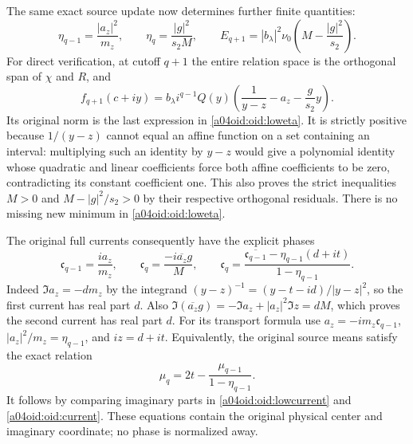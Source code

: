 The same exact source update now determines further finite quantities:
\begin{equation}\label{a04oid:oid:loweta}
 \boxed{\eta_{q-1}=\frac{|a_z|^2}{m_z},\qquad
 \eta_q=\frac{|g|^2}{s_2M},\qquad
 E_{q+1}=|b_\lambda|^2\nu_0
 \left(M-\frac{|g|^2}{s_2}\right).}
\end{equation}
For direct verification, at cutoff $q+1$ the entire relation space
is the orthogonal span of $\chi$ and $R$, and
\[
 f_{q+1}(c+iy)=b_\lambda i^{q-1}Q(y)
 \left(\frac1{y-z}-a_z-\frac{g}{s_2}y\right).
\]
Its original norm is the last expression in \eqref{a04oid:oid:loweta}.
It is strictly positive because $1/(y-z)$ cannot equal an affine
function on a set containing an interval: multiplying such an
identity by $y-z$ would give a polynomial identity whose quadratic
and linear coefficients force both affine coefficients to be zero,
contradicting its constant coefficient one. This also proves the
strict inequalities $M>0$ and $M-|g|^2/s_2>0$ by their respective
orthogonal residuals. There is no missing new minimum in
\eqref{a04oid:oid:loweta}.

The original full currents consequently have the explicit phases
\begin{equation}\label{a04oid:oid:lowcurrent}
 \mathfrak c_{q-1}=\frac{i a_z}{m_z},\qquad
 \mathfrak c_q=\frac{-i\overline{a_z}g}{M},\qquad
 \boxed{\mathfrak c_q=
 \frac{\overline{\mathfrak c_{q-1}}
 -\eta_{q-1}(d+it)}{1-\eta_{q-1}}.}
\end{equation}
Indeed $\Im a_z=-dm_z$ by the integrand
$(y-z)^{-1}=(y-t-id)/|y-z|^2$, so the first current has real
part $d$. Also
$\Im(\overline{a_z}g)=-\Im a_z+|a_z|^2\Im z=dM$,
which proves the second current has real part $d$.
For its transport formula use
$a_z=-im_z\mathfrak c_{q-1}$,
$|a_z|^2/m_z=\eta_{q-1}$, and $iz=d+it$.
Equivalently, the original source means satisfy the exact relation
\begin{equation}\label{a04oid:oid:lowmean}
 \mu_q=2t-\frac{\mu_{q-1}}{1-\eta_{q-1}}.
\end{equation}
It follows by comparing imaginary parts in \eqref{a04oid:oid:lowcurrent}
and \eqref{a04oid:oid:current}. These equations contain the original
physical center and imaginary coordinate; no phase is normalized away.

